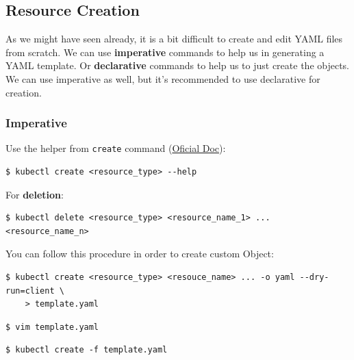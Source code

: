 \documentclass{article}
\newenvironment{blocktemplateII}[1]{%
    \tcolorbox[beamer,%
    noparskip,breakable,
    colframe=Green,%
    colbacklower=LimeGreen!75!LightGreen,%
    title=#1]}%
    {\endtcolorbox}
\newenvironment{codetemplate}[1][]{%
  \mybasecolorbox[#1]
  \itshape
}{%
  \endmybasecolorbox
}
\begin{document}
\subsection{Resource Creation}
As we might have seen already, it is a bit difficult to create and edit YAML files 
from scratch. We can use \textbf{imperative} commands to help us in generating a 
YAML template. Or \textbf{declarative} commands to help us to just create the objects.
We can use imperative as well, but it's recommended to use declarative for creation.

\subsubsection{Imperative}
Use the helper from \verb|create| command (\href{https://jamesdefabia.github.io/docs/user-guide/kubectl/kubectl_create/}{Oficial Doc}):
\begin{codetemplate}
\begin{verbatim}
$ kubectl create <resource_type> --help
\end{verbatim}
\end{codetemplate}

For \textbf{deletion}:
\begin{codetemplate}
\begin{verbatim}
$ kubectl delete <resource_type> <resource_name_1> ... <resource_name_n>
\end{verbatim}
\end{codetemplate}

\begin{blocktemplateII}{NOTE}
You can follow this procedure in order to create custom Object:
\begin{codetemplate}{}
\begin{verbatim}
$ kubectl create <resource_type> <resouce_name> ... -o yaml --dry-run=client \ 
    > template.yaml
\end{verbatim}
\end{codetemplate}
\begin{codetemplate}{}
\begin{verbatim}
$ vim template.yaml
\end{verbatim}
\end{codetemplate}
\begin{codetemplate}{}
\begin{verbatim}
$ kubectl create -f template.yaml
\end{verbatim}
\end{codetemplate}
\end{blocktemplateII}
\end{document}
